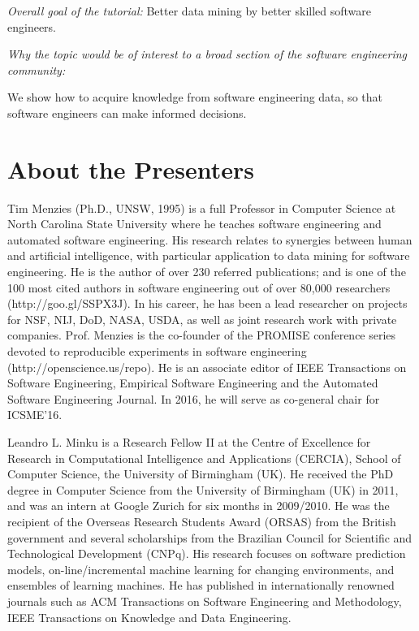 \documentclass[conference]{IEEEtran}
\begin{document}
{\em Overall goal of the tutorial:} Better data mining by better skilled software engineers.


{\em Why the topic would be of interest to a broad section of the software engineering community:} 

  We show how to acquire knowledge from software engineering data, so that software engineers can make informed decisions.
\section{About the Presenters}

Tim Menzies (Ph.D., UNSW, 1995) is a full Professor in Computer Science at North Carolina State University where he teaches software engineering and automated software engineering. His research relates to synergies between human and artificial intelligence, with particular application to data mining for software engineering.
He is the author of over 230 referred publications; and is one of the 100 most cited authors in software engineering out of over 80,000 researchers (http://goo.gl/SSPX3J). In his career, he has been a lead researcher on projects for NSF, NIJ, DoD, NASA, USDA, as well as joint research work with private companies.
Prof. Menzies is the co-founder of the PROMISE conference series devoted to reproducible experiments in software engineering (http://openscience.us/repo). He is an associate editor of IEEE Transactions on Software Engineering, Empirical Software Engineering and the Automated Software Engineering Journal. In 2016, he will serve as co-general chair for ICSME'16.


Leandro L. Minku is a Research Fellow II at the Centre of Excellence for Research in Computational Intelligence and Applications (CERCIA), School of Computer Science, the University of Birmingham (UK). He received the PhD degree in Computer Science from the University of Birmingham (UK) in 2011, and was an intern at Google Zurich for six months in 2009/2010. He was the recipient of the Overseas Research Students Award (ORSAS) from the British government and several scholarships from the Brazilian Council for Scientific and Technological Development (CNPq). His research focuses on software prediction models, on-line/incremental machine learning for changing environments, and ensembles of learning machines. He has published in internationally renowned journals such as ACM Transactions on Software Engineering and Methodology, IEEE Transactions on Knowledge and Data Engineering.
\end{document}

